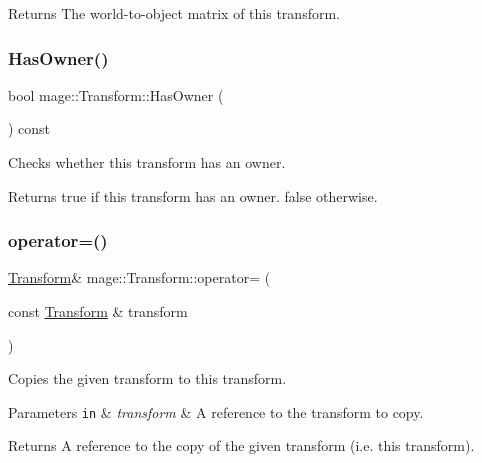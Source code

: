 \begin{DoxyReturn}{Returns}
The world-\/to-\/object matrix of this transform. 
\end{DoxyReturn}
\mbox{\label{classmage_1_1_transform_ac24796b2d6179c1488410d36afdf6b68}} 
\subsubsection{\texorpdfstring{Has\+Owner()}{HasOwner()}}
{\footnotesize\ttfamily bool mage\+::\+Transform\+::\+Has\+Owner (\begin{DoxyParamCaption}{ }\end{DoxyParamCaption}) const\hspace{0.3cm}{\ttfamily [noexcept]}}

Checks whether this transform has an owner.

\begin{DoxyReturn}{Returns}
{\ttfamily true} if this transform has an owner. {\ttfamily false} otherwise. 
\end{DoxyReturn}
\mbox{\label{classmage_1_1_transform_a5541fef38c72592a32c06fcbb2199d8d}} 
\subsubsection{\texorpdfstring{operator=()}{operator=()}\hspace{0.1cm}{\footnotesize\ttfamily [1/2]}}
{\footnotesize\ttfamily \mbox{\hyperlink{classmage_1_1_transform}{Transform}}\& mage\+::\+Transform\+::operator= (\begin{DoxyParamCaption}\item[{const \mbox{\hyperlink{classmage_1_1_transform}{Transform}} \&}]{transform }\end{DoxyParamCaption})\hspace{0.3cm}{\ttfamily [noexcept]}}

Copies the given transform to this transform.


\begin{DoxyParams}[1]{Parameters}
\mbox{\tt in}  & {\em transform} & A reference to the transform to copy. \\
\hline
\end{DoxyParams}
\begin{DoxyReturn}{Returns}
A reference to the copy of the given transform (i.\+e. this transform). 
\end{DoxyReturn}
\mbox{\label{classmage_1_1_transform_a7ed96cf9bc81595035537139c118efce}} 
